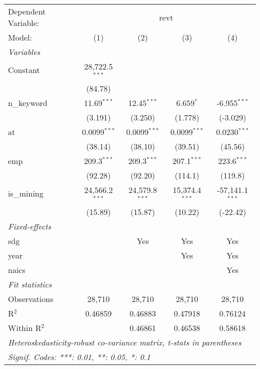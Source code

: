 
\begingroup
\centering
\begin{tabular}{lcccc}
   \tabularnewline \midrule \midrule
   Dependent Variable: & \multicolumn{4}{c}{revt}\\
   Model:       & (1)              & (2)              & (3)              & (4)\\  
   \midrule
   \emph{Variables}\\
   Constant     & 28,722.5$^{***}$ &                  &                  &   \\   
                & (84.78)          &                  &                  &   \\   
   n\_keyword   & 11.69$^{***}$    & 12.45$^{***}$    & 6.659$^{*}$      & -6.955$^{***}$\\   
                & (3.191)          & (3.250)          & (1.778)          & (-3.029)\\   
   at           & 0.0099$^{***}$   & 0.0099$^{***}$   & 0.0099$^{***}$   & 0.0230$^{***}$\\   
                & (38.14)          & (38.10)          & (39.51)          & (45.56)\\   
   emp          & 209.3$^{***}$    & 209.3$^{***}$    & 207.1$^{***}$    & 223.6$^{***}$\\   
                & (92.28)          & (92.20)          & (114.1)          & (119.8)\\   
   is\_mining   & 24,566.2$^{***}$ & 24,579.8$^{***}$ & 15,374.4$^{***}$ & -57,141.1$^{***}$\\   
                & (15.89)          & (15.87)          & (10.22)          & (-22.42)\\   
   \midrule
   \emph{Fixed-effects}\\
   sdg          &                  & Yes              & Yes              & Yes\\  
   year         &                  &                  & Yes              & Yes\\  
   naics        &                  &                  &                  & Yes\\  
   \midrule
   \emph{Fit statistics}\\
   Observations & 28,710           & 28,710           & 28,710           & 28,710\\  
   R$^2$        & 0.46859          & 0.46883          & 0.47918          & 0.76124\\  
   Within R$^2$ &                  & 0.46861          & 0.46538          & 0.58618\\  
   \midrule \midrule
   \multicolumn{5}{l}{\emph{Heteroskedasticity-robust co-variance matrix, t-stats in parentheses}}\\
   \multicolumn{5}{l}{\emph{Signif. Codes: ***: 0.01, **: 0.05, *: 0.1}}\\
\end{tabular}
\par\endgroup



